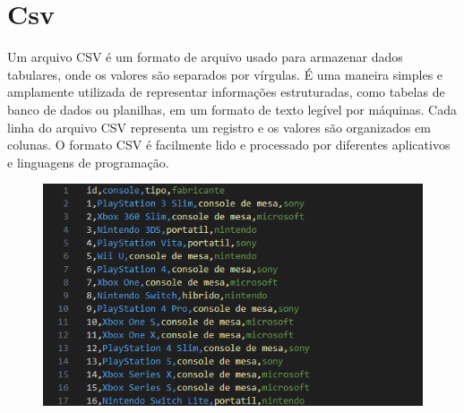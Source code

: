 \newpage

\section*{\Large Csv}

Um arquivo CSV é um formato de arquivo usado para armazenar dados tabulares, onde os valores são separados por vírgulas. É uma maneira simples e amplamente utilizada de representar informações estruturadas, como tabelas de banco de dados ou planilhas, em um formato de texto legível por máquinas. Cada linha do arquivo CSV representa um registro e os valores são organizados em colunas. O formato CSV é facilmente lido e processado por diferentes aplicativos e linguagens de programação.

\vspace{1cm}

\begin{figure}[!htpb]
    \centering
    \includegraphics[width=170mm]{CSV.png}
\end{figure}
